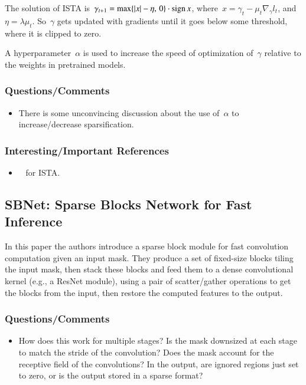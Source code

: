 \documentclass[a4paper, 12pt]{article}
\DeclareMathOperator{\sign}{sign}
\DeclarePairedDelimiter\abs{\lvert}{\rvert}%
\begin{document}
The solution of ISTA
is~$\gamma_{t + 1} = \max\{\abs{x} - \eta,\, 0\} \cdot \sign{x}$,
where~$x = \gamma_t - \mu_t \nabla_\gamma l_t$, and~$\eta = \lambda \mu_t$.
So~$\gamma$ gets updated with gradients until it goes below some threshold,
where it is clipped to zero.

A hyperparameter~$\alpha$ is used to increase the speed of optimization
of~$\gamma$ relative to the weights in pretrained models.

\subsubsection{Questions/Comments}

\begin{itemize}
        \item There is some unconvincing discussion about the use of~$\alpha$
                to increase/decrease sparsification.
\end{itemize}

\subsubsection{Interesting/Important References}

\begin{itemize}
        \item~\cite{beck2009afast} for ISTA.
\end{itemize}


\subsection{SBNet: Sparse Blocks Network for Fast
            Inference~\cite{ren2018sbnet}}

In this paper the authors introduce a sparse block module for fast convolution
computation given an input mask. They produce a set of fixed-size blocks tiling
the input mask, then stack these blocks and feed them to a dense convolutional
kernel (e.g., a ResNet module), using a pair of scatter/gather operations to
get the blocks from the input, then restore the computed features to the
output.

\subsubsection{Questions/Comments}

\begin{itemize}
        \item How does this work for multiple stages? Is the mask downsized at
                each stage to match the stride of the convolution? Does the
                mask account for the receptive field of the convolutions? In
                the output, are ignored regions just set to zero, or is the
                output stored in a sparse format?
\end{itemize}
\end{document}
